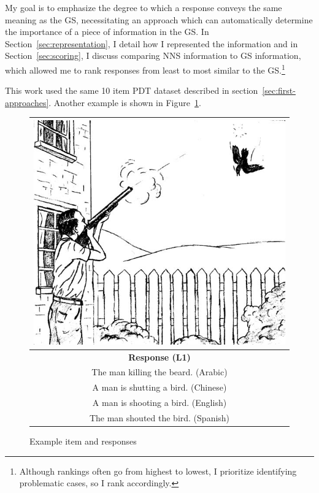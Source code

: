 My goal is to emphasize the degree to which a response conveys the same
meaning as the GS, necessitating an approach which can automatically
determine the importance of a piece of information in the GS.  In Section~\ref{sec:representation}, I detail how I represented the information
 and in Section~\ref{sec:scoring}, I discuss comparing NNS
information to GS information, which allowed me
to rank responses from least to most similar to the GS.\footnote{Although rankings often go from highest to lowest, I prioritize identifying problematic cases, so I rank accordingly.}

This work used the same 10 item PDT dataset described in section~\ref{sec:first-approaches}. Another example is shown in Figure~\ref{fig:example-picture2}.

\begin{figure}
\begin{center}
\begin{tabular}{|c|}
\hline
\includegraphics[width=0.95\columnwidth]{figures/exampleprompt2.jpg}\\
\hline
\textbf{Response (L1)} \\
\hline
The man killing the beard. (Arabic)\\
\hline
A man is shutting a bird. (Chinese) \\
\hline
A man is shooting a bird. (English) \\
\hline
The man shouted the bird. (Spanish)\\
\hline
\end{tabular}
\end{center}
\caption{Example item and responses}
\label{fig:example-picture2}
\end{figure}

